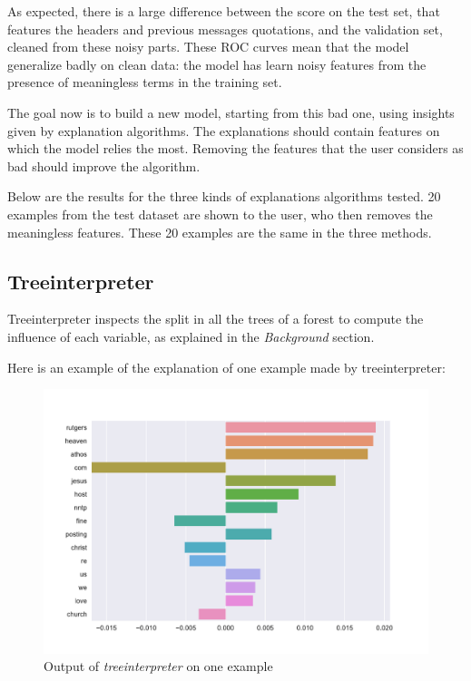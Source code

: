 \documentclass[a4paper,11pt]{kth-mag}
\begin{document}
As expected, there is a large difference between the score on the test set, that features the headers and previous messages quotations, and the validation set, cleaned from these noisy parts. These ROC curves mean that the model generalize badly on clean data: the model has learn noisy features from the presence of meaningless terms in the training set.

The goal now is to build a new model, starting from this bad one, using insights given by explanation algorithms. The explanations should contain features on which the model relies the most. Removing the features that the user considers as bad should improve the algorithm.

Below are the results for the three kinds of explanations algorithms tested. 20 examples from the test dataset are shown to the user, who then removes the meaningless features. These 20 examples are the same in the three methods.

\subsection{Treeinterpreter}

Treeinterpreter inspects the split in all the trees of a forest to compute the influence of each variable, as explained in the \textit{Background} section.

Here is an example of the explanation of one example made by treeinterpreter:

\begin{figure}[!h]
	\centering
   	\def\svgwidth{\columnwidth}
	\includegraphics[scale=0.35]{img/tree_interpreter.pdf}
    \caption{Output of \textit{treeinterpreter} on one example}
\end{figure}
\end{document}
